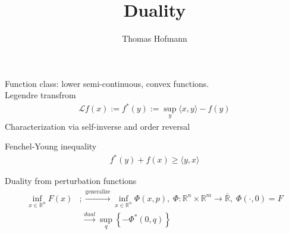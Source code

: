 \documentclass{article}
\title{Duality}
\author{Thomas Hofmann}
\renewcommand{\Re}{{\mathbb R}}
\newcommand{\fenchel}{{\mathcal L}}
\begin{document}
Function class: lower semi-continuous, convex functions. \\
Legendre transfrom
\begin{align}
\fenchel f(x) := f^*(y) := \sup_{y} \langle x, y \rangle - f(y) 
\end{align}
Characterization via self-inverse and order reversal \cite[Theorem 1]{artstein2009concept}

Fenchel-Young inequality 
\begin{align}
f^*(y) + f(x) \ge \langle y, x \rangle 
\end{align}

Duality from perturbation functions
\begin{align}
 \inf_{x \in \Re^n} F(x) & ;\stackrel{\text{generalize}}{\longrightarrow} \inf_{x \in \Re^n} \Phi(x,p), \; \Phi: \Re^n \times \Re^m \to \bar \Re, \; \Phi(\cdot,0) = F 
 \\
& \; \stackrel{dual}{\longrightarrow} \sup_{q} \left\{ - \Phi^*(0,q) \right\}
\end{align}



\end{document}

